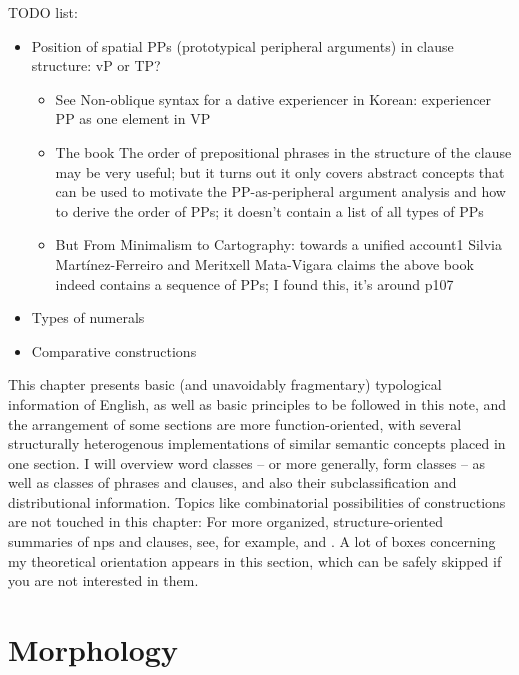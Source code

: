 \documentclass[UTF8, a4paper, oneside, scheme=plain]{ctexrep}
\begin{document}
TODO list:
\begin{itemize}
    \item Position of spatial PPs (prototypical peripheral arguments) in clause structure: vP or TP?
    \begin{itemize}
        \item See Non-oblique syntax for a dative experiencer in Korean: experiencer PP as one element in VP
        \item The book The order of prepositional phrases in the structure of the clause may be very useful;
        but it turns out it only covers abstract concepts that can be used to motivate the PP-as-peripheral argument analysis and how to derive the order of PPs; it doesn't contain a list of all types of PPs
        \item But From Minimalism to Cartography: towards a unified account1
        Silvia Martínez-Ferreiro and Meritxell Mata-Vigara claims the above book indeed contains 
        a sequence of PPs; I found this, it's around p107
    \end{itemize}
    \item Types of numerals 
    \item Comparative constructions
\end{itemize}

This chapter presents basic (and unavoidably fragmentary) typological information of English,
as well as basic principles to be followed in this note,
and the arrangement of some sections are more function-oriented, 
with several structurally heterogenous implementations of 
similar semantic concepts placed in one section.
I will overview word classes -- or more generally, form classes -- 
as well as classes of phrases and clauses,
and also their subclassification and distributional information.
Topics like combinatorial possibilities of constructions
are not touched in this chapter:
For more organized, structure-oriented summaries of 
\acs{np}s and clauses, 
see, for example,  and .
A lot of boxes concerning my theoretical orientation appears in this section,
which can be safely skipped if you are not interested in them.

\section{Morphology}
\end{document}
